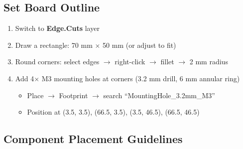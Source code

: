 \documentclass[a4paper,11pt]{article}
\renewcommand*{\,}{ }%
\begin{document}
\subsection{Set Board Outline}

\begin{enumerate}
    \item Switch to \textbf{Edge.Cuts} layer
    \item Draw a rectangle: 70\,mm $\times$ 50\,mm (or adjust to fit)
    \item Round corners: select edges $\rightarrow$ right-click $\rightarrow$ fillet $\rightarrow$ 2\,mm radius
    \item Add 4$\times$ M3 mounting holes at corners (3.2\,mm drill, 6\,mm annular ring)
    \begin{itemize}[noitemsep]
        \item Place $\rightarrow$ Footprint $\rightarrow$ search ``MountingHole\_3.2mm\_M3''
        \item Position at (3.5, 3.5), (66.5, 3.5), (3.5, 46.5), (66.5, 46.5)
    \end{itemize}
\end{enumerate}

\subsection{Component Placement Guidelines}
\end{document}

